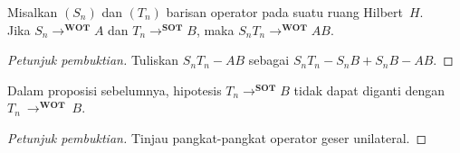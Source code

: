 \begin{prop} Misalkan $(S_n)$ dan $(T_n)$ barisan operator pada suatu ruang Hilbert~$H$. \\
Jika $S_n \to^{\textbf{WOT}} A$ dan $T_n \to^{\textbf{SOT}} B$, maka $S_nT_n \to^{\textbf{WOT}} AB$.
\end{prop}

\begin{proof}[\emph{Petunjuk pembuktian}] Tuliskan $S_nT_n - AB$ sebagai $S_nT_n - S_nB + S_nB - AB$.  \ns
\end{proof}

\begin{exam} Dalam proposisi sebelumnya, hipotesis $T_n \to^{\textbf{SOT}} B$ tidak dapat
diganti dengan $T_n~\to^{\textbf{WOT}}~B$.
\end{exam}

\begin{proof}[\emph{Petunjuk pembuktian}] Tinjau pangkat-pangkat operator geser unilateral.  \ns
\end{proof}






\endinput
